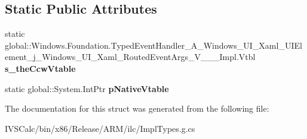 \subsection*{Static Public Attributes}
\begin{DoxyCompactItemize}
\item 
\mbox{\label{struct_windows_1_1_foundation_1_1_typed_event_handler___a___windows___u_i___xaml___u_i_element__783b71f1d8ea86c7251f457c77949e7c_a1ba469caf2507697226048e61ff5d1bc}} 
static global\+::\+Windows.\+Foundation.\+Typed\+Event\+Handler\+\_\+\+A\+\_\+\+Windows\+\_\+\+U\+I\+\_\+\+Xaml\+\_\+\+U\+I\+Element\+\_\+j\+\_\+\+Windows\+\_\+\+U\+I\+\_\+\+Xaml\+\_\+\+Routed\+Event\+Args\+\_\+\+V\+\_\+\+\_\+\+\_\+\+Impl.\+Vtbl {\bfseries s\+\_\+the\+Ccw\+Vtable}
\item 
\mbox{\label{struct_windows_1_1_foundation_1_1_typed_event_handler___a___windows___u_i___xaml___u_i_element__783b71f1d8ea86c7251f457c77949e7c_a7b64df3a0455d59bd6779bcb9d2ef214}} 
static global\+::\+System.\+Int\+Ptr {\bfseries p\+Native\+Vtable}
\end{DoxyCompactItemize}


The documentation for this struct was generated from the following file\+:\begin{DoxyCompactItemize}
\item 
I\+V\+S\+Calc/bin/x86/\+Release/\+A\+R\+M/ilc/Impl\+Types.\+g.\+cs\end{DoxyCompactItemize}
